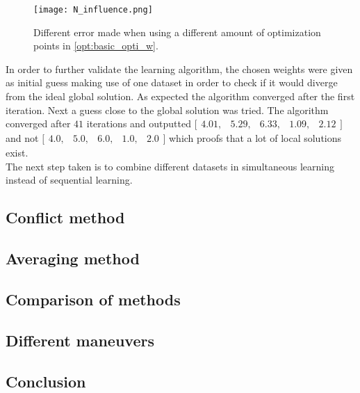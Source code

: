  \begin{figure}[h!]
 	\centering
 	\texttt{[image: N\_influence.png]}
 	\caption{Different error made when using a different amount of optimization points in \ref{opt:basic_opti_w}.}
 	\label{fig:N_influence}
 \end{figure}
 
 In order to further validate the learning algorithm, the chosen weights were given as initial guess making use of one dataset in order to check if it would diverge from the ideal global solution. As expected the algorithm converged after the first iteration. Next a guess close to the global solution was tried. The algorithm converged after $41$ iterations and outputted $\bigl[ \begin{smallmatrix} 4.01,&5.29,&6.33,&1.09,&2.12\end{smallmatrix}\bigr]$ and not $\bigl[ \begin{smallmatrix} 4.0,&5.0,&6.0,&1.0,&2.0\end{smallmatrix}\bigr]$ which proofs that a lot of local solutions exist.\\  
 
 The next step taken is to combine different datasets in simultaneous learning instead of sequential learning.
 
 \subsection{Conflict method}
 
 \subsection{Averaging method}
 
 \subsection{Comparison of methods}
  
 \subsection{Different maneuvers}
 
 \subsection{Conclusion}




